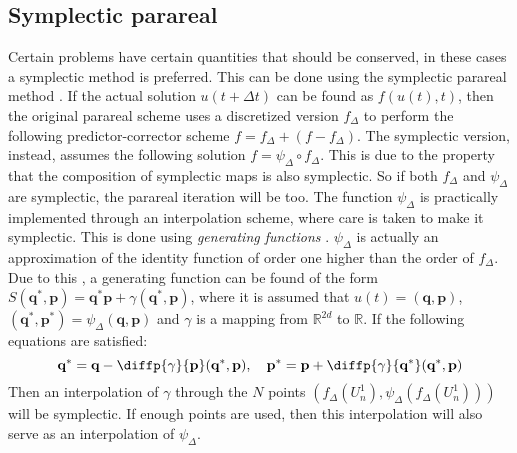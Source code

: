 \subsection{Symplectic parareal}
\label{subsec: intro symplectic parareal}
Certain problems have certain quantities that should be conserved, in these cases a symplectic method is preferred. This can be done using the symplectic parareal method \cite{bal_symplectic_2008}. If the actual solution $u(t + \Delta t)$ can be found as $f(u(t),t)$, then the original parareal scheme uses a discretized version $f_{\Delta}$ to perform the following predictor-corrector scheme $f = f_\Delta + (f - f_\Delta)
$. The symplectic version, instead, assumes the following solution $f = \psi_\Delta \circ f_\Delta$. This is due to the property that the composition of symplectic maps is also symplectic. So if both $f_\Delta$ and $\psi_\Delta$ are symplectic, the parareal iteration will be too. The function $\psi_\Delta$ is practically implemented through an interpolation scheme, where care is taken to make it symplectic. This is done using \textit{generating functions} \cite{hairer_geometric_2006}.  $\psi_\Delta$ is actually an approximation of the identity function of order one higher than the order of $f_{\Delta}$. Due to this \cite{hairer_geometric_2006}, a generating function can be found of the form $S(\textbf{q}^*, \textbf{p}) = \textbf{q}^* \textbf{p} + \gamma(\textbf{q}^*, \textbf{p})$, where it is assumed that $u(t) = (\textbf{q},\textbf{p})$, $(\textbf{q}^*, \textbf{p}^*) = \psi_\Delta(\textbf{q},\textbf{p})$ and $\gamma$ is a mapping from $\mathbb{R}^{2d}$ to $\mathbb{R}$. If the following equations are satisfied:
\[\textbf{q}^* = \textbf{q} - \diffp{\gamma}{{\textbf{p}}}(\textbf{q}^*, \textbf{p}), \quad 
	\textbf{p}^* = \textbf{p} + \diffp{\gamma}{{{\textbf{q}^{*}}}}(\textbf{q}^*, \textbf{p})\]
Then an interpolation of $\gamma$ through the $N$ points $(f_\Delta(U^1_n),\psi_\Delta(f_\Delta(U^1_n)))$ will be symplectic. If enough points are used, then this interpolation will also serve as an interpolation of $\psi_\Delta$\cite{bal_symplectic_2008}.

\color{black}

